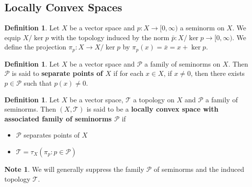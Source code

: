 \documentclass[12pt]{amsart}
\theoremstyle{definition}
\newtheorem{defn}[definition]{Definition}
\newtheorem{note}[definition]{Note}
\newcommand{\MP}{\mathcal{P}}
\newcommand{\MT}{\mathcal{T}}
\newcommand{\Rg}{[0,\infty)}
\begin{document}
	

	






















	
	
	
	
	
	
	
	

	
	\newpage
	\subsection{Locally Convex Spaces}
	
	\begin{defn}
		Let $X$ be a vector space and $p:X \rightarrow [0, \infty)$ a seminorm on $X$. We equip $X / \ker p$ with the topology induced by the norm $\bar{p}:X / \ker p \rightarrow \Rg$. We define the projection $\pi_p: X \rightarrow X / \ker p$ by $\pi_p(x) = \bar{x} = x + \ker p$.
	\end{defn}
	
	\begin{defn}
		Let $X$ be a vector space and $\MP$ a family of seminorms on $X$. Then $\MP$ is said to \textbf{separate points of $X$} if for each $x \in X$, if $x \neq 0$, then there exists $p \in \MP$ such that $p(x) \neq 0$.
	\end{defn}
	
	\begin{defn}
		Let $X$ be a vector space, $\MT$ a topology on $X$ and $\MP$ a family of seminorms. Then $(X, \MT)$ is said to be a \textbf{locally convex space with associated family of seminorms $\MP$} if 
		\begin{itemize}
			\item $\MP$ separates points of $X$
			\item $\MT = \tau_X(\pi_p : p \in \MP)$
		\end{itemize} 
	\end{defn}
	
	\begin{note}
		We will generally suppress the family $\MP$ of seminorms and the induced topology $\MT$.
	\end{note}
	
\end{document}
